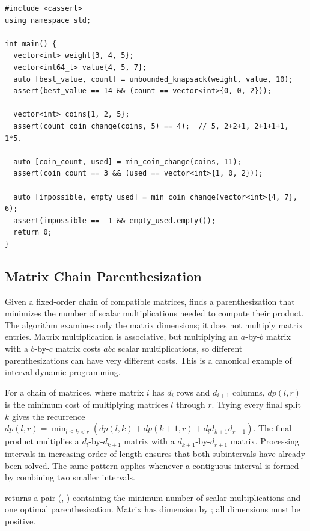 \begin{lstlisting}[style=cpp]
#include <cassert>
using namespace std;

int main() {
  vector<int> weight{3, 4, 5};
  vector<int64_t> value{4, 5, 7};
  auto [best_value, count] = unbounded_knapsack(weight, value, 10);
  assert(best_value == 14 && (count == vector<int>{0, 0, 2}));

  vector<int> coins{1, 2, 5};
  assert(count_coin_change(coins, 5) == 4);  // 5, 2+2+1, 2+1+1+1, 1*5.

  auto [coin_count, used] = min_coin_change(coins, 11);
  assert(coin_count == 3 && (used == vector<int>{1, 0, 2}));

  auto [impossible, empty_used] = min_coin_change(vector<int>{4, 7}, 6);
  assert(impossible == -1 && empty_used.empty());
  return 0;
}
\end{lstlisting}
\subsection{Matrix Chain Parenthesization}
\label{sec:1.3.5}
Given a fixed-order chain of compatible matrices, finds a parenthesization that minimizes the number of scalar multiplications needed to compute their product. The algorithm examines only the matrix dimensions; it does not multiply matrix entries. Matrix multiplication is associative, but multiplying an $a$-by-$b$ matrix with a $b$-by-$c$ matrix costs $abc$ scalar multiplications, so different parenthesizations can have very different costs. This is a canonical example of interval dynamic programming.

For a chain of matrices, where matrix $i$ has $d_i$ rows and $d_{i+1}$ columns, $dp(l, r)$ is the minimum cost of multiplying matrices $l$ through $r$. Trying every final split $k$ gives the recurrence $dp(l, r) = \min_{l \le k < r}(dp(l, k) + dp(k + 1, r) + d_l d_{k+1} d_{r+1})$. The final product multiplies a $d_l$-by-$d_{k+1}$ matrix with a $d_{k+1}$-by-$d_{r+1}$ matrix. Processing intervals in increasing order of length ensures that both subintervals have already been solved. The same pattern applies whenever a contiguous interval is formed by combining two smaller intervals.

\begin{compactitem}
  \item {} returns a pair (, ) containing the minimum number of scalar multiplications and one optimal parenthesization. Matrix  has dimension  by ; all dimensions must be positive.
\end{compactitem}

